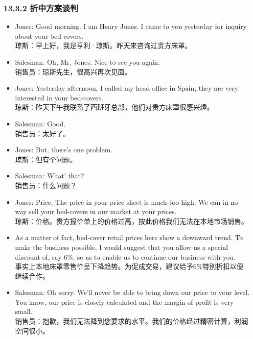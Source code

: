     \begin{frame}[allowframebreaks]
    \frametitle{13.3.2 折中方案谈判}
    \begin{itemize}
    \item Jones: Good morning. I am Henry Jones. I came to you yesterday for inquiry about your bed-covers. \\
    \small{琼斯：早上好，我是亨利·琼斯。昨天来咨询过贵方床罩。}
    
    \item Salesman: Oh, Mr. Jones. Nice to see you again. \\
    \small{销售员：琼斯先生，很高兴再次见面。}
    
    \item Jones: Yesterday afternoon, I called my head office in Spain, they are very interested in your bed-covers. \\
    \small{琼斯：昨天下午我联系了西班牙总部，他们对贵方床罩很感兴趣。}
    
    \item Salesman: Good. \\
    \small{销售员：太好了。}
    
    \item Jones: But, there’s one problem. \\
    \small{琼斯：但有个问题。}
    
    \item Salesman: What’ that? \\
    \small{销售员：什么问题？}
    
    \item Jones: Price. The price in your price sheet is much too high. We can in no way sell your bed-covers in our market at your prices. \\
    \small{琼斯：价格。贵方报价单上的价格过高，按此价格我们无法在本地市场销售。}
    
    \item As a matter of fact, bed-cover retail prices here show a downward trend. To make the business possible, I would suggest that you allow us a special discount of, say 6\%, so as to enable us to continue our business with you. \\
    \small{事实上本地床罩零售价呈下降趋势。为促成交易，建议给予6\%特别折扣以便继续合作。}
    
    \item Salesman: Oh sorry. We’ll never be able to bring down our price to your level. You know, our price is closely calculated and the margin of profit is very small. \\
    \small{销售员：抱歉，我们无法降到您要求的水平。我们的价格经过精密计算，利润空间很小。}
    

\end{itemize}
\end{frame}

